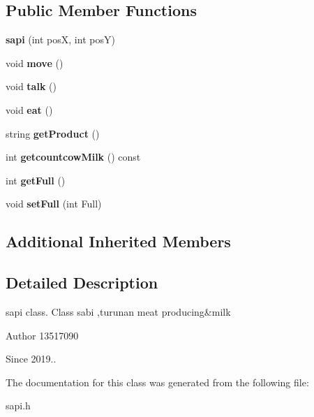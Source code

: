 \subsection*{Public Member Functions}
\begin{DoxyCompactItemize}
\item 
\mbox{\label{classsapi_a62abc4f374396934025399c7717c6403}} 
{\bfseries sapi} (int posX, int posY)
\item 
\mbox{\label{classsapi_a24e7f17568fa9fa1b814edbc20d0fc02}} 
void {\bfseries move} ()
\item 
\mbox{\label{classsapi_a394f5198322bce5ddff6073207112021}} 
void {\bfseries talk} ()
\item 
\mbox{\label{classsapi_ad93bc475bc6e43da1509374d001ad66b}} 
void {\bfseries eat} ()
\item 
\mbox{\label{classsapi_a0d9805f004e41e59b5a4929b28626474}} 
string {\bfseries get\+Product} ()
\item 
\mbox{\label{classsapi_af45394d0812bb1ba304ceb795b85cb82}} 
int {\bfseries getcountcow\+Milk} () const
\item 
\mbox{\label{classsapi_ac2cea89f18795443a7ddb87d871768a0}} 
int {\bfseries get\+Full} ()
\item 
\mbox{\label{classsapi_a24a69158e59a6b8fab669517626e7d03}} 
void {\bfseries set\+Full} (int Full)
\end{DoxyCompactItemize}
\subsection*{Additional Inherited Members}


\subsection{Detailed Description}
sapi class. Class sabi ,turunan meat producing\&milk \begin{DoxyAuthor}{Author}
13517090 
\end{DoxyAuthor}
\begin{DoxySince}{Since}
2019.. 
\end{DoxySince}


The documentation for this class was generated from the following file\+:\begin{DoxyCompactItemize}
\item 
sapi.\+h\end{DoxyCompactItemize}
